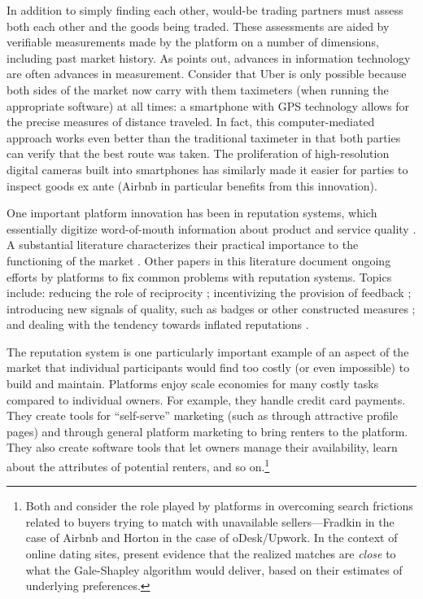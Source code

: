 \documentclass[11pt]{article}
\begin{document}
In addition to simply finding each other, would-be trading partners must assess both each other and the goods being traded. 
These assessments are aided by verifiable measurements made by the platform on a number of dimensions, including past market history. 
As \cite{varian2010computer} points out, advances in information technology are often advances in measurement.  
Consider that Uber is only possible because both sides of the market now carry with them taximeters (when running the appropriate software) at all times: 
a smartphone with GPS technology allows for the precise measures of distance traveled.
In fact, this computer-mediated approach works even better than the traditional taximeter in that both parties can verify that the best route was taken. 
The proliferation of high-resolution digital cameras built into smartphones has similarly made it easier for parties to inspect goods ex ante (Airbnb in particular benefits from this innovation).  

One important platform innovation has been in reputation systems, which essentially digitize word-of-mouth information about product and service quality \cite{dellarocas2003digitization}. 
A substantial literature characterizes their practical importance to the functioning of the market \citep{cabral2010dynamics, resnick2000reputation, resnick2002trust}.
Other papers in this literature document ongoing efforts by platforms to fix common problems with reputation systems.
Topics include: reducing the role of reciprocity \citep{bolton2013engineering};
incentivizing the provision of feedback \citep{fradkin2015bias}; 
introducing new signals of quality, such as badges or other constructed measures \citep{hui2014lemon, nosko2015limits}; 
and dealing with the tendency towards inflated reputations \citep{horton2015reputation}.  

The reputation system is one particularly important example of an aspect of the market that individual participants would find too costly (or even impossible) to build and maintain. 
Platforms enjoy scale economies for many costly tasks compared to individual owners. 
For example, they handle credit card payments. 
They create tools for ``self-serve'' marketing (such as through attractive profile pages) and through general platform marketing to bring renters to the platform. 
They also create software tools that let owners manage their availability, learn about the attributes of potential renters, and so on.\footnote{
  Both \cite{horton2014misdirected} and \cite{fradkin2013search} consider the role played by platforms in overcoming search frictions related to buyers trying to match with unavailable sellers---Fradkin in the case of Airbnb and Horton in the case of oDesk/Upwork.
  In the context of online dating sites, \cite{hitsch2010matching} present evidence that the realized matches are \emph{close} to what the Gale-Shapley algorithm would deliver, based on their estimates of underlying preferences.
}
\end{document}
